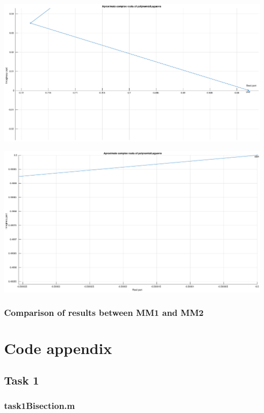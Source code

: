 \documentclass[12pt]{report}
\begin{document}
\begin{center}
   \includegraphics[scale=0.25]{task3complexdown.eps}
\end{center}

\begin{center}
   \includegraphics[scale=0.25]{task3complexup.eps}
\end{center}


\subsection{Comparison of results between MM1 and MM2}

\chapter{Code appendix}

\section{Task 1}

\subsection{task1Bisection.m}
\end{document}
